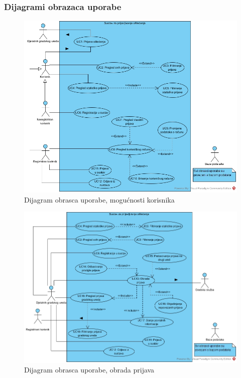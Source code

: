 				\eject
					
				\subsubsection{Dijagrami obrazaca uporabe}
					
					\begin{figure}[H]
						\includegraphics[width=\textwidth]{slike/Funkcionalnosti_korisnikaUCD.jpg} %
						\caption{Dijagram obrasca uporabe, mogućnosti korisnika}
						\label{fig:dijagramObrascaUporabe1} %
					\end{figure}
					
					\begin{figure}[H]
						\includegraphics[width=\textwidth]{slike/Obrada_prijavaUCD.jpg} %
						\caption{Dijagram obrasca uporabe, obrada prijava}
						\label{fig:dijagramObrascaUporabe2} %
					\end{figure}
					
